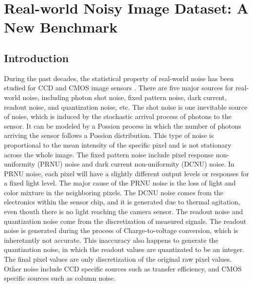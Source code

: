 %
\chapter{Real-world Noisy Image Dataset: A New Benchmark}
\label{sec:dataset}

\section{Introduction}

During the past decades, the statistical property of real-world noise has been studied for CCD and CMOS image sensors \cite{healey1994radiometric,tsin2001statistical,RENOIR2014,crosschannel2016,dnd2017}. There are five major sources for real-world noise, including photon shot noise, fixed pattern noise, dark current, readout noise, and quantization noise, etc. The shot noise is one inevitable source of noise, which is induced by the stochastic arrival process of photons to the sensor. It can be modeled by a Possion process in which the number of photons arriving the sensor follows a Possion distribution. This type of noise is proportional to the mean intensity of the specific pixel and is not stationary across the whole image. The fixed pattern noise include pixel response non-uniformity (PRNU) noise and dark current non-uniformity (DCNU) noise. In PRNU noise, each pixel will have a slightly different output levels or responses for a fixed light level. The major cause of the PRNU noise is the loss of light and color mixture in the neighboring pixels. The DCNU noise comes from the electronics within the sensor chip, and it is generated due to thermal agitation, even thouth there is no light reaching the camera sensor. The readout noise and quantization noise come from the discretization of measured signals. The readout noise is generated during the process of Charge-to-voltage conversion, which is inheretantly not accurate. This inaccuracy also happens to generate the quantization noise, in which the readout values are quantizated to be an integer. The final pixel values are only discretization of the original raw pixel values. Other noise include CCD specific sources such as transfer efficiency, and CMOS specific sources such as column noise.

